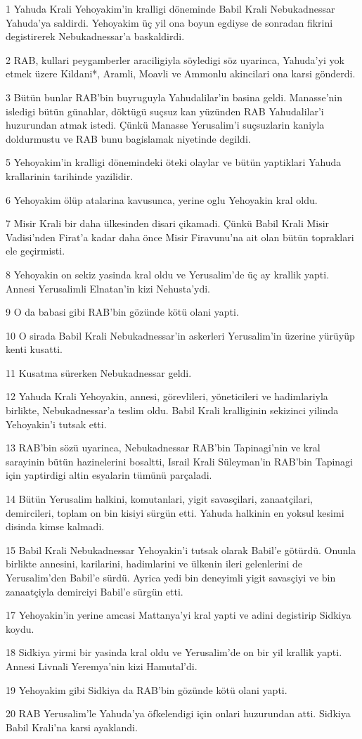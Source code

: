 \par 1 Yahuda Krali Yehoyakim'in kralligi döneminde Babil Krali Nebukadnessar Yahuda'ya saldirdi. Yehoyakim üç yil ona boyun egdiyse de sonradan fikrini degistirerek Nebukadnessar'a baskaldirdi.
\par 2 RAB, kullari peygamberler araciligiyla söyledigi söz uyarinca, Yahuda'yi yok etmek üzere Kildani*, Aramli, Moavli ve Ammonlu akincilari ona karsi gönderdi.
\par 3 Bütün bunlar RAB'bin buyruguyla Yahudalilar'in basina geldi. Manasse'nin isledigi bütün günahlar, döktügü suçsuz kan yüzünden RAB Yahudalilar'i huzurundan atmak istedi. Çünkü Manasse Yerusalim'i suçsuzlarin kaniyla doldurmustu ve RAB bunu bagislamak niyetinde degildi.
\par 5 Yehoyakim'in kralligi dönemindeki öteki olaylar ve bütün yaptiklari Yahuda krallarinin tarihinde yazilidir.
\par 6 Yehoyakim ölüp atalarina kavusunca, yerine oglu Yehoyakin kral oldu.
\par 7 Misir Krali bir daha ülkesinden disari çikamadi. Çünkü Babil Krali Misir Vadisi'nden Firat'a kadar daha önce Misir Firavunu'na ait olan bütün topraklari ele geçirmisti.
\par 8 Yehoyakin on sekiz yasinda kral oldu ve Yerusalim'de üç ay krallik yapti. Annesi Yerusalimli Elnatan'in kizi Nehusta'ydi.
\par 9 O da babasi gibi RAB'bin gözünde kötü olani yapti.
\par 10 O sirada Babil Krali Nebukadnessar'in askerleri Yerusalim'in üzerine yürüyüp kenti kusatti.
\par 11 Kusatma sürerken Nebukadnessar geldi.
\par 12 Yahuda Krali Yehoyakin, annesi, görevlileri, yöneticileri ve hadimlariyla birlikte, Nebukadnessar'a teslim oldu. Babil Krali kralliginin sekizinci yilinda Yehoyakin'i tutsak etti.
\par 13 RAB'bin sözü uyarinca, Nebukadnessar RAB'bin Tapinagi'nin ve kral sarayinin bütün hazinelerini bosaltti, Israil Krali Süleyman'in RAB'bin Tapinagi için yaptirdigi altin esyalarin tümünü parçaladi.
\par 14 Bütün Yerusalim halkini, komutanlari, yigit savasçilari, zanaatçilari, demircileri, toplam on bin kisiyi sürgün etti. Yahuda halkinin en yoksul kesimi disinda kimse kalmadi.
\par 15 Babil Krali Nebukadnessar Yehoyakin'i tutsak olarak Babil'e götürdü. Onunla birlikte annesini, karilarini, hadimlarini ve ülkenin ileri gelenlerini de Yerusalim'den Babil'e sürdü. Ayrica yedi bin deneyimli yigit savasçiyi ve bin zanaatçiyla demirciyi Babil'e sürgün etti.
\par 17 Yehoyakin'in yerine amcasi Mattanya'yi kral yapti ve adini degistirip Sidkiya koydu.
\par 18 Sidkiya yirmi bir yasinda kral oldu ve Yerusalim'de on bir yil krallik yapti. Annesi Livnali Yeremya'nin kizi Hamutal'di.
\par 19 Yehoyakim gibi Sidkiya da RAB'bin gözünde kötü olani yapti.
\par 20 RAB Yerusalim'le Yahuda'ya öfkelendigi için onlari huzurundan atti. Sidkiya Babil Krali'na karsi ayaklandi.

